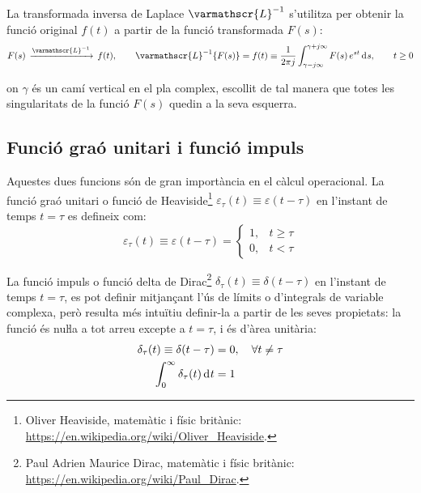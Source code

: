 La transformada inversa de Laplace $\varmathscr{L}^{-1}$ s'utilitza per
obtenir la funció original $f(t)$ a partir de la funció
transformada $F(s)$:
\begin{equation}
	F(s)\,\xrightarrow{\varmathscr{L}^{-1}}\,f(t), \qquad
    \varmathscr{L}^{-1}\{F(s)\} = f(t) \equiv \frac{1}{2 \pi j }
    \int_{\gamma-j \infty}^{\gamma+j \infty} F(s)\, e^{s t} \diff s,
    \qquad t\geq 0 \label{eq:transf_inv_laplace}
\end{equation}

on $\gamma$ és un camí vertical en el pla complex, escollit de tal
manera que totes les singularitats de la funció $F(s)$ quedin a la
seva esquerra.

\subsection{Funció graó unitari i funció impuls} 

Aquestes dues funcions són de gran importància en el càlcul
operacional. La funció graó unitari o funció de Heaviside\footnote{Oliver Heaviside, matemàtic i físic britànic: \href{https://en.wikipedia.org/wiki/Oliver_Heaviside}{https:/\!\!/en.wikipedia.org/wiki/Oliver\_Heaviside}.}
$\varepsilon_\tau(t) \equiv \varepsilon(t-\tau)$ en l'instant de temps
$t=\tau$ es defineix com:
\begin{equation}
    \varepsilon_\tau(t) \equiv \varepsilon(t-\tau) = \begin{cases} 1, & t \geq \tau \\ 0, & t < \tau \end{cases}
\end{equation}

La funció impuls o funció delta de Dirac\footnote{Paul Adrien Maurice Dirac, matemàtic i físic britànic: \href{https://en.wikipedia.org/wiki/Paul_Dirac}{https:/\!\!/en.wikipedia.org/wiki/Paul\_Dirac}.} $\delta_\tau(t) \equiv
\delta(t-\tau)$ en l'instant de temps $t=\tau$, es pot definir
mitjançant l'ús de límits o d'integrals de variable complexa, però
resulta més intuïtiu definir-la a partir de les seves propietats: la
funció és nuŀla a tot arreu excepte a $t=\tau$, i és d'àrea
unitària:
\begin{subequations}
\begin{align}
    \delta_\tau(t) \equiv \delta(t-\tau) &= 0, \quad \forall t \neq \tau \\
    \int_0^\infty \delta_\tau(t) \diff t &= 1
\end{align}
\end{subequations}

